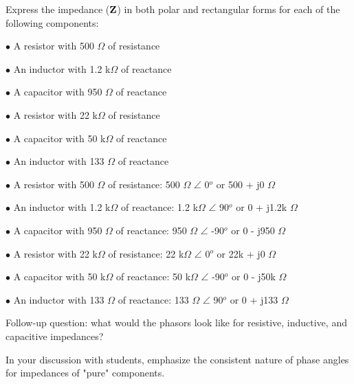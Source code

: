 

Express the impedance (${\bf Z}$) in both polar and rectangular forms for each of the following components:

\medskip
\goodbreak
\item{$\bullet$} A resistor with 500 $\Omega$ of resistance
\item{$\bullet$} An inductor with 1.2 k$\Omega$ of reactance
\item{$\bullet$} A capacitor with 950 $\Omega$ of reactance
\item{$\bullet$} A resistor with 22 k$\Omega$ of resistance
\item{$\bullet$} A capacitor with 50 k$\Omega$ of reactance
\item{$\bullet$} An inductor with 133 $\Omega$ of reactance
\medskip







\medskip
\item{$\bullet$} A resistor with 500 $\Omega$ of resistance: 500 $\Omega$ $\angle$ 0$^{o}$ or 500 + j0 $\Omega$
\item{$\bullet$} An inductor with 1.2 k$\Omega$ of reactance: 1.2 k$\Omega$ $\angle$ 90$^{o}$ or 0 + j1.2k $\Omega$
\item{$\bullet$} A capacitor with 950 $\Omega$ of reactance: 950 $\Omega$ $\angle$ -90$^{o}$ or 0 - j950 $\Omega$
\item{$\bullet$} A resistor with 22 k$\Omega$ of resistance: 22 k$\Omega$ $\angle$ 0$^{o}$ or 22k + j0 $\Omega$
\item{$\bullet$} A capacitor with 50 k$\Omega$ of reactance: 50 k$\Omega$ $\angle$ -90$^{o}$ or 0 - j50k $\Omega$
\item{$\bullet$} An inductor with 133 $\Omega$ of reactance: 133 $\Omega$ $\angle$ 90$^{o}$ or 0 + j133 $\Omega$
\medskip

\vskip 10pt

Follow-up question: what would the phasors look like for resistive, inductive, and capacitive impedances?







In your discussion with students, emphasize the consistent nature of phase angles for impedances of "pure" components.




